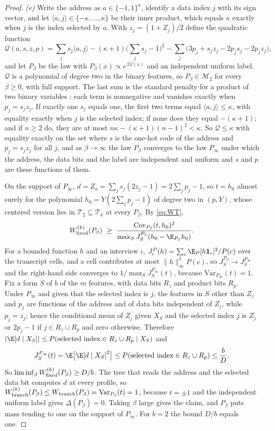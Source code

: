\begin{proof}
\emph{(e)} Write the address as $a\in\{-1,1\}^\kappa$, identify a data index
$j$ with its sign vector, and let $\langle a,j\rangle\in\{-\kappa,\ldots,\kappa\}$
be their inner product, which equals $\kappa$ exactly when $j$ is the index
selected by $a$. With $z_j=(1+Z_j)/2$ define the quadratic function
\[
 \mathcal Q(a,s,z,p)=\sum_js_j\langle a,j\rangle-(\kappa+1)\Big(\sum_js_j-1\Big)^2
   -\sum_j\big(3p_j+s_jz_j-2p_js_j-2p_jz_j\big),
\]
and let $P_\beta$ be the law with $P_\beta(x)\propto e^{\beta\mathcal Q(x)}$ and an
independent uniform label. $\mathcal Q$ is a polynomial of degree two in the binary
features, so $P_\beta\in\mathcal M_2$ for every $\beta\ge0$, with full
support. The last sum is the standard penalty for a product of two binary
variables \citep{boros2002}: each term is nonnegative and vanishes exactly
when $p_j=s_jz_j$. If exactly one $s_j$ equals one, the first two terms equal
$\langle a,j\rangle\le\kappa$, with equality exactly when $j$ is the selected
index; if none does they equal $-(\kappa+1)$; and if $n\ge2$ do, they are at
most $n\kappa-(\kappa+1)(n-1)^2<\kappa$. So $\mathcal Q\le\kappa$ with equality
exactly on the set where $s$ is the one-hot code of the address and
$p_j=s_jz_j$ for all $j$, and as $\beta\to\infty$ the law $P_\beta$ converges
to the law $P_\infty$ under which the address, the data bits and the label
are independent and uniform and $s$ and $p$ are these functions of them.

On the support of $P_\infty$,
$d=Z_{a}=\sum_js_j(2z_j-1)=2\sum_jp_j-1$, so $t=h_0$ almost surely for the
polynomial $h_0=Y(2\sum_jp_j-1)$ of degree two in $(p,Y)$, whose centered
version lies in $\mathcal T_2\subseteq\mathcal T_k$ at every $P_\beta$. By
\eqref{eq:WT},
\[
 W^{(k)}_{\rm fixed}(P_\beta)\ \ge\ \frac{\mathrm{Cov}_{P_\beta}(t,h_0)^2}{\max_SJ^{P_\beta}_S(h_0-\E_{P_\beta}h_0)} .
\]
For a bounded function $h$ and an interview $\iota$,
$J^P_\iota(h)=\sum_c\E_P[h\mathbf 1_c]^2/P(c)$ over the transcript cells, and
a cell contributes at most $\|h\|_\infty^2P(c)$, so $J^{P_\beta}_S\to
J^{P_\infty}_S$ and the right-hand side converges to
$1/\max_SJ^{P_\infty}_S(t)$, because $\mathrm{Var}_{P_\infty}(t)=1$. Fix a
form $S$ of $b$ of the $m$ features, with data bits $R_z$ and product bits
$R_p$. Under $P_\infty$ and given that the selected index is $j$, the
features in $S$ other than $Z_j$ and $p_j$ are functions of the address and
of data bits independent of $Z_j$, while $p_j=z_j$; hence the conditional
mean of $Z_j$ given $X_S$ and the selected index $j$ is $Z_j$ or $2p_j-1$ if
$j\in R_z\cup R_p$ and zero otherwise. Therefore
$|\E[d\mid X_S]|\le P(\text{selected index}\in R_z\cup R_p\mid X_S)$ and
\[
 J^{P_\infty}_S(t)=\E\big[\E[d\mid X_S]^2\big]\le P(\text{selected index}\in R_z\cup R_p)\le\frac bD .
\]
So $\liminf_\beta W^{(k)}_{\rm fixed}(P_\beta)\ge D/b$. The tree that reads the
address and the selected data bit computes $d$ at every profile, so
$W^{(k)}_{\rm branch}(P_\beta)\le W_{\rm branch}(P_\beta)=\mathrm{Var}_{P_\beta}(t)=1$,
because $t=\pm1$ and the independent uniform label gives $\Delta(P_\beta)=0$.
Taking $\beta$ large gives the claim, and $P_\beta$ puts mass tending to one
on the support of $P_\infty$. For $b=2$ the bound $D/b$ equals one.
\end{proof}

